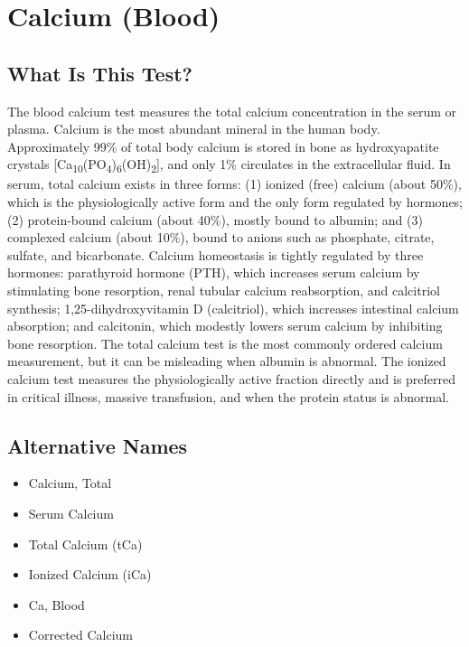 \chapter{Calcium (Blood)}

\section*{What Is This Test?}
The blood calcium test measures the total calcium concentration in the serum or plasma. Calcium is the most abundant mineral in the human body. Approximately 99\% of total body calcium is stored in bone as hydroxyapatite crystals [Ca\textsubscript{10}(PO\textsubscript{4})\textsubscript{6}(OH)\textsubscript{2}], and only 1\% circulates in the extracellular fluid. In serum, total calcium exists in three forms: (1) ionized (free) calcium (about 50\%), which is the physiologically active form and the only form regulated by hormones; (2) protein-bound calcium (about 40\%), mostly bound to albumin; and (3) complexed calcium (about 10\%), bound to anions such as phosphate, citrate, sulfate, and bicarbonate. Calcium homeostasis is tightly regulated by three hormones: parathyroid hormone (PTH), which increases serum calcium by stimulating bone resorption, renal tubular calcium reabsorption, and calcitriol synthesis; 1,25-dihydroxyvitamin D (calcitriol), which increases intestinal calcium absorption; and calcitonin, which modestly lowers serum calcium by inhibiting bone resorption. The total calcium test is the most commonly ordered calcium measurement, but it can be misleading when albumin is abnormal. The ionized calcium test measures the physiologically active fraction directly and is preferred in critical illness, massive transfusion, and when the protein status is abnormal.

\section*{Alternative Names}
\begin{itemize}
  \item Calcium, Total
  \item Serum Calcium
  \item Total Calcium (tCa)
  \item Ionized Calcium (iCa)
  \item Ca, Blood
  \item Corrected Calcium
\end{itemize}
